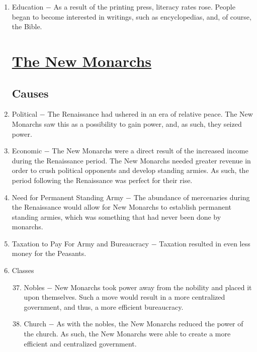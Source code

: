 \documentclass[12pt]{article}
\begin{document}
\begin{enumerate}
\item Education $-$ As a result of the printing press, literacy rates rose. People began to become interested in writings, such as encyclopedias, and, of course, the Bible.

\begin{center}
\section{\underline{The New Monarchs}}
\end{center}

\subsection{Causes}

\item Political $-$ The Renaissance had ushered in an era of relative peace. The New Monarchs saw this as a possibility to gain power, and, as such, they seized power.

\item Economic $-$ The New Monarchs were a direct result of the increased income during the Renaissance period. The New Monarchs needed greater revenue in order to crush political opponents and develop standing armies. As such, the period following the Renaissance was perfect for their rise.

\item Need for Permanent Standing Army $-$ The abundance of mercenaries during the Renaissance would allow for New Monarchs to establish permanent standing armies, which was something that had never been done by monarchs.

\item Taxation to Pay For Army and Bureaucracy $-$ Taxation resulted in even less money for the Peasants.

\item Classes
\begin{enumerate}[label=\arabic{*}.]
\setcounter{enumii}{36}
\item Nobles $-$ New Monarchs took power away from the nobility and placed it upon themselves. Such a move would result in a more centralized government, and thus, a more efficient bureaucracy.

\item Church $-$ As with the nobles, the New Monarchs reduced the power of the church. As such, the New Monarchs were able to create a more efficient and centralized government.


\end{enumerate}
\end{enumerate}
\end{document}
